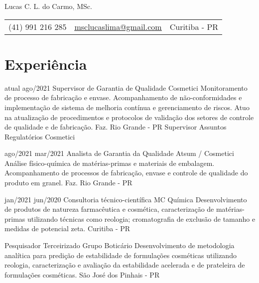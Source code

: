 \pagestyle{fancy} %
\fancyhf{} 
\renewcommand{\headrulewidth}{0pt}


\thispagestyle{empty}

\begin{center}
	
	{\LARGE Lucas C. L. do Carmo, MSc.}
	
	\vspace{6pt}
	\begin{tabular}{c|c|c}
		(41) 991 216 285 & \textcolor{Accent}{\underline{\href{mailto:msclucaslima@gmail.com}{msclucaslima@gmail.com}}} & Curitiba - PR
	\end{tabular}

	\vspace{6pt}
	
\end{center}
	

\section{Experiência}

{atual}
{ago/2021}
{Supervisor de Garantia de Qualidade}
{Cosmetici}
{
	Monitoramento de processo de fabricação e envase.
	Acompanhamento de não-conformidades e implementação de
	sistema de melhoria contínua e gerenciamento de riscos.
	Atuo na atualização de procedimentos e protocolos de validação dos setores
	de controle de qualidade e de fabricação.
}
{Faz. Rio Grande - PR}
{Supervisor Assuntos Regulatórios}
{Cosmetici}
{}

\entry
{ago/2021}
{mar/2021}
{Analista de Garantia da Qualidade}
{Atsum / Cosmetici}
{
	Análise físico-química de matérias-primas e materiais de embalagem.
	Acompanhamento de processos de fabricação, envase e controle de qualidade do
	produto em granel.
}
{Faz. Rio Grande - PR}

\entry
{jan/2021}
{jun/2020}
{Consultoria técnico-científica}
{MC Química}
{
	Desenvolvimento de produtos de natureza farmacêutica e cosmética, 
	caracterização de matérias-primas utilizando técnicas como reologia;
	cromatografia de exclusão de tamanho e medidas de potencial zeta.
}
{Curitiba - PR}

{Pesquisador Terceirizado}
{Grupo Boticário}
{
	Desenvolvimento de metodologia analítica para predição de estabilidade
	de formulações cosméticas utilizando reologia,
	caracterização e avaliação da estabilidade acelerada e de prateleira
	de formulações cosméticas.
}
{São José dos Pinhais - PR}

